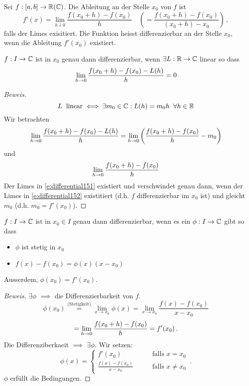 \begin{Def}
  Sei $f:\left[ a,b \right]\to\mathbb{R}(\mathbb{C})$. Die Ableitung an der Stelle $x_0$ von $f$ ist
  \[f'(x)=\lim_{h\downarrow 0}\frac{f(x_0+h)-f(x_0)}{h}
\quad \left(= \frac{f(x_0+h)-f(x_0)}{(x_0+h)-x_0}\right)\, ,\]
falls der Limes exisitiert.  
Die Funktion heisst differenzierbar an der Stelle $x_0$, wenn die Ableitung $f'(x_0)$ existiert.
\end{Def}
\begin{Sat}
  $f:I\to\mathbb{C}$ ist in $x_0$ genau dann differenzierbar, wenn $\exists L:\mathbb{R}\to\mathbb{C}$ linear so dass
  \[\displaystyle\lim_{h\rightarrow0}\frac{f(x_0+h)-f(x_0)-L(h)}{h}=0\]
\end{Sat}
\begin{proof}[Beweis]
  \[L\hspace{2mm}\text{linear}\iff\exists m_0\in\mathbb{C}: L(h)=m_0h\hspace{2mm}\forall h\in\mathbb{R}\]
Wir betrachten 
  \begin{equation}
    \label{e:differential151}
    \displaystyle\lim_{h\rightarrow0}\frac{f(x_0+h)-f(x_0)-L(h)}{h} =
\displaystyle\lim_{h\rightarrow0} \left(\frac{f(x_0+h)-f(x_0)}{h}-m_0\right)
  \end{equation}
und
  \begin{equation}
    \label{e:differential152}
    \displaystyle\lim_{h\rightarrow0}\frac{f(x_0+h)-f(x_0)}{h}
  \end{equation}
Der Limes in \eqref{e:differential151} existiert und verschwindet genau
dann, wenn der Limes in \eqref{e:differential152} existitiert (d.h.
$f$ differenzierbar im $x_0$ ist) und gleicht $m_0$ (d.h. $m_0=f'(x_0)$).
\end{proof}
\begin{Sat}
  $f:I\to\mathbb{C}$ ist in $x_0\in I$ genau dann differenzierbar, wenn es ein $\phi:I\to\mathbb{C}$ gibt so dass
  \begin{itemize}
    \item $\phi$ ist stetig in $x_0$
    \item $f(x)-f(x_0)=\phi(x)(x-x_0)$
  \end{itemize}
Ausserdem, $\phi (x_0)= f'(x_0)$.
\end{Sat}
\begin{proof}[Beweis]
  $\exists\phi$ $\implies$ die Differenzierbarkeit von $f$.
  \[\phi(x_0)\stackrel{\mbox{(Stetigkeit)}}{=} \lim_{x\to x_0} \phi (x) =\lim_{x\to x_0}\frac{f(x)-f(x_0)}{x-x_0}\]
  \[=\displaystyle\lim_{h\rightarrow0}\frac{f(x_0+h)-f(x_0)}{h}=f'(x_0)\, .\]
  Die Differenziberkaeit $\implies$ $\exists \phi$. Wir setzen:
    \[\phi (x)=\begin{cases}
      f'(x_0)&\qquad \mbox{falls } x=x_0\\
      \frac{f(x)-f(x_0)}{x-x_0}&\qquad \mbox{falls } x\neq x_0
    \end{cases}\, .\]
$\phi$ erfüllt die Bedingungen.
\end{proof}
